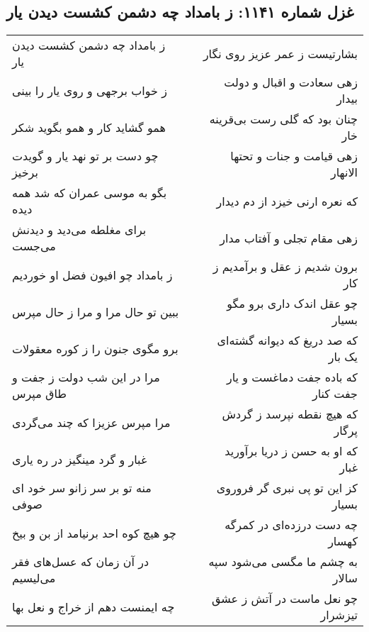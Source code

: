 \begin{center}
\section*{غزل شماره ۱۱۴۱: ز بامداد چه دشمن کشست دیدن یار}
\label{sec:1141}
\begin{longtable}{l p{0.5cm} r}
ز بامداد چه دشمن کشست دیدن یار
&&
بشارتیست ز عمر عزیز روی نگار
\\
ز خواب برجهی و روی یار را بینی
&&
زهی سعادت و اقبال و دولت بیدار
\\
همو گشاید کار و همو بگوید شکر
&&
چنان بود که گلی رست بی‌قرینه خار
\\
چو دست بر تو نهد یار و گویدت برخیز
&&
زهی قیامت و جنات و تحتها الانهار
\\
بگو به موسی عمران که شد همه دیده
&&
که نعره ارنی خیزد از دم دیدار
\\
برای مغلطه می‌دید و دیدنش می‌جست
&&
زهی مقام تجلی و آفتاب مدار
\\
ز بامداد چو افیون فضل او خوردیم
&&
برون شدیم ز عقل و برآمدیم ز کار
\\
ببین تو حال مرا و مرا ز حال مپرس
&&
چو عقل اندک داری برو مگو بسیار
\\
برو مگوی جنون را ز کوره معقولات
&&
که صد دریغ که دیوانه گشته‌ای یک بار
\\
مرا در این شب دولت ز جفت و طاق مپرس
&&
که باده جفت دماغست و یار جفت کنار
\\
مرا مپرس عزیزا که چند می‌گردی
&&
که هیچ نقطه نپرسد ز گردش پرگار
\\
غبار و گرد مینگیز در ره یاری
&&
که او به حسن ز دریا برآورید غبار
\\
منه تو بر سر زانو سر خود ای صوفی
&&
کز این تو پی نبری گر فروروی بسیار
\\
چو هیچ کوه احد برنیامد از بن و بیخ
&&
چه دست درزده‌ای در کمرگه کهسار
\\
در آن زمان که عسل‌های فقر می‌لیسیم
&&
به چشم ما مگسی می‌شود سپه سالار
\\
چه ایمنست دهم از خراج و نعل بها
&&
چو نعل ماست در آتش ز عشق تیزشرار
\\
\end{longtable}
\end{center}
